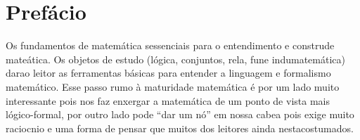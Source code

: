 \chapter*{Pref\'acio}

Os fundamentos de matem\'atica s\ao essenciais para o entendimento e constru\cao de mate\'atica. Os objetos de estudo (l\'ogica, conjuntos, rela\cois, fun\coes e indu\cao matem\'atica) dar\ao ao leitor as ferramentas b\'asicas para entender a linguagem e formalismo matem\'atico. Esse passo rumo \`a maturidade matem\'atica \'e por um lado muito interessante pois nos faz enxergar a matem\'atica de um ponto de vista mais l\'ogico-formal, por outro lado pode ``dar um n\'o'' em nossa cabe\cc a pois exige muito racioc\ih nio e uma forma de pensar que muitos dos leitores ainda n\ao est\ao acostumados.   


